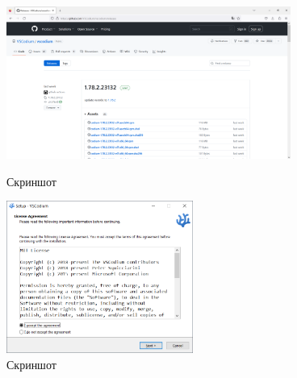 \begin{figure}[!phtb]
    \centering

    \begin{minipage}{0.49\textwidth}
        \centering

        \includegraphics[height=5cm]
        {images/install/vs-codium/1.png}

        \caption{Скриншот}

        \label{fig:vscodium_1}
    \end{minipage}
    \begin{minipage}{0.49\textwidth}
        \centering

        \includegraphics[height=5cm]
        {images/install/vs-codium/2.png}

        \caption{Скриншот}

        \label{fig:vscodium_2}
    \end{minipage}
\end{figure}

